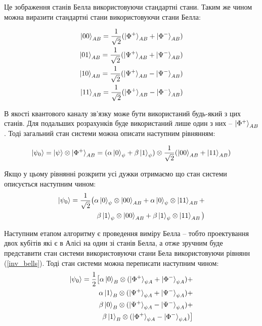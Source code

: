 \documentclass{article}
\begin{document}
Це зображення станів Белла використовуючи стандартні стани. Таким же чином можна виразити стандартні стани використовуючи стани Белла:

\begin{align}
\begin{split}
\ket{00}_{AB} = \frac{1}{\sqrt{2}}(\ket{\Phi^+}_{AB} + \ket{\Phi^-}_{AB}) \\
\ket{01}_{AB} = \frac{1}{\sqrt{2}}(\ket{\Psi^+}_{AB} + \ket{\Psi^-}_{AB}) \\
\ket{10}_{AB} = \frac{1}{\sqrt{2}}(\ket{\Psi^+}_{AB} - \ket{\Psi^-}_{AB}) \\
\ket{11}_{AB} = \frac{1}{\sqrt{2}}(\ket{\Phi^+}_{AB} - \ket{\Phi^-}_{AB})
\end{split}
\label{inv_bells}
\end{align}

В якості квантового каналу зв'язку може бути використаний будь-який з цих станів. 
Для подальших розрахунків буде використаний лише один з них -- $\ket{\Phi^+}_{AB}$.
Тоді загальний стан системи можна описати наступним рівнянням:

\begin{align*}
    \ket{\psi_0} = \ket{\psi} \otimes \ket{\Phi^+}_{AB} = (\alpha\ket{0}_\psi + \beta\ket{1}_\psi) \otimes \frac{1}{\sqrt{2}}(\ket{00}_{AB} + \ket{11}_{AB})
\end{align*}

Якщо у цьому рівнянні розкрити усі дужки отримаємо що стан системи описується наступним чином: 
\begin{align*}
    \ket{\psi_0} = \frac{1}{\sqrt{2}}
    \big(\alpha\ket{0}_\psi\otimes\ket{00}_{AB} +
    \alpha\ket{0}_\psi\otimes\ket{11}_{AB} + \\
    \beta\ket{1}_\psi\otimes\ket{00}_{AB} + 
    \beta\ket{1}_\psi\otimes\ket{11}_{AB}\big)
\end{align*}

Наступним етапом алгоритму є проведення виміру Белла -- тобто проектування двох кубітів які є в Алісі на один зі станів Белла, а отже зручним буде представити стан системи використовуючи стани Бела використовуючи рівнянн (\ref{inv_bells}).
Тоді стан системи можна переписати наступним чином:
\begin{align*}
    \ket{\psi_0} = \frac{1}{2}\big[
    \alpha\ket{0}_B\otimes(\ket{\Phi^+}_{\psi A} + \ket{\Phi^-}_{\psi A}) + \\
    \alpha\ket{1}_B\otimes(\ket{\Psi^+}_{\psi A} + \ket{\Psi^-}_{\psi A}) + \\
    \beta\ket{0}_B\otimes(\ket{\Psi^+}_{\psi A} - \ket{\Psi^-}_{\psi A}) + \\
    \beta\ket{1}_B\otimes(\ket{\Phi^+}_{\psi A} - \ket{\Phi^-}_{\psi A})
    \big]
\end{align*}
\end{document}
